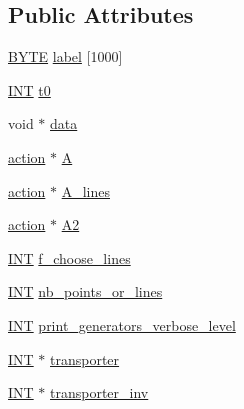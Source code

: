 \subsection*{Public Attributes}
\begin{DoxyCompactItemize}
\item 
\mbox{\hyperlink{galois_8h_ab6cc7b4aeb6ea31aba2b3fbfc83ff5e6}{B\+Y\+TE}} \mbox{\hyperlink{classchoose__points__or__lines_a4b164908b2ac88c3ce1f9e7c279c0713}{label}} \mbox{[}1000\mbox{]}
\item 
\mbox{\hyperlink{galois_8h_a09fddde158a3a20bd2dcadb609de11dc}{I\+NT}} \mbox{\hyperlink{classchoose__points__or__lines_a48594397c8587e2375d56fed0b7fa935}{t0}}
\item 
void $\ast$ \mbox{\hyperlink{classchoose__points__or__lines_a8afcc173b9891ea488adc7a8708b5185}{data}}
\item 
\mbox{\hyperlink{classaction}{action}} $\ast$ \mbox{\hyperlink{classchoose__points__or__lines_a1add29c580d140e6a6e975d5169d52b2}{A}}
\item 
\mbox{\hyperlink{classaction}{action}} $\ast$ \mbox{\hyperlink{classchoose__points__or__lines_a23ce15bda20ef3eab0915ad818ba601c}{A\+\_\+lines}}
\item 
\mbox{\hyperlink{classaction}{action}} $\ast$ \mbox{\hyperlink{classchoose__points__or__lines_a2c7fba7177a8e6407b94b6113db91aba}{A2}}
\item 
\mbox{\hyperlink{galois_8h_a09fddde158a3a20bd2dcadb609de11dc}{I\+NT}} \mbox{\hyperlink{classchoose__points__or__lines_ac3140cc550032777037cf6cf201ca126}{f\+\_\+choose\+\_\+lines}}
\item 
\mbox{\hyperlink{galois_8h_a09fddde158a3a20bd2dcadb609de11dc}{I\+NT}} \mbox{\hyperlink{classchoose__points__or__lines_a814a1f56c0c272684f7b96723f776d59}{nb\+\_\+points\+\_\+or\+\_\+lines}}
\item 
\mbox{\hyperlink{galois_8h_a09fddde158a3a20bd2dcadb609de11dc}{I\+NT}} \mbox{\hyperlink{classchoose__points__or__lines_abd2c0a017adcb070cb86149572526f47}{print\+\_\+generators\+\_\+verbose\+\_\+level}}
\item 
\mbox{\hyperlink{galois_8h_a09fddde158a3a20bd2dcadb609de11dc}{I\+NT}} $\ast$ \mbox{\hyperlink{classchoose__points__or__lines_a0f8269ae48e76984b6cdbd0c25087159}{transporter}}
\item 
\mbox{\hyperlink{galois_8h_a09fddde158a3a20bd2dcadb609de11dc}{I\+NT}} $\ast$ \mbox{\hyperlink{classchoose__points__or__lines_a234146c3e48b5e4e26d73c273f5e9cf1}{transporter\+\_\+inv}}
\item 

\end{DoxyCompactItemize}
